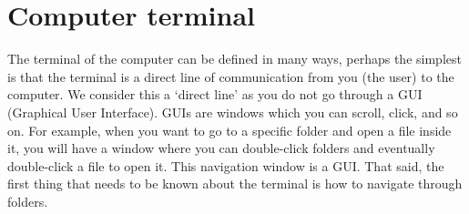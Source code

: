 \section{Computer terminal \label{sec:terminal}}
The terminal of the computer can be defined in many ways, perhaps the simplest is that the terminal is a direct line of communication from you (the user) to the computer. We consider this a `direct line' as you do not go through a GUI (Graphical User Interface). GUIs are windows which you can scroll, click, and so on. For example, when you want to go to a specific folder and open a file inside it, you will have a window where you can double-click folders and eventually double-click a file to open it. This navigation window is a GUI. That said, the first thing that needs to be known about the terminal is how to navigate through folders.\\
